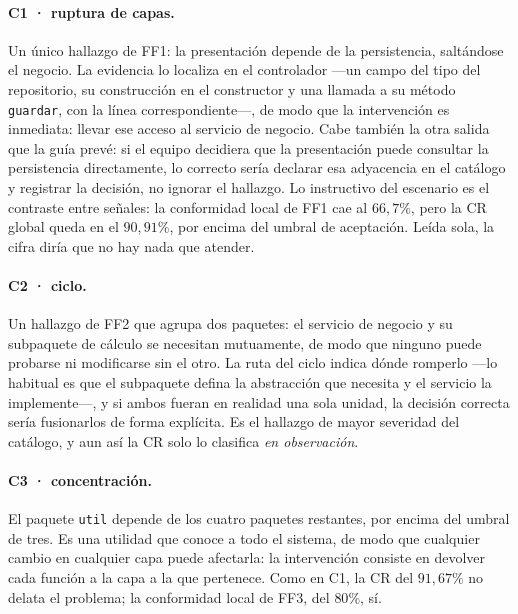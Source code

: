 \paragraph{C1 · ruptura de capas.} Un único hallazgo de FF1: la presentación depende de la persistencia, saltándose el negocio. La evidencia lo localiza en el controlador ---un campo del tipo del repositorio, su construcción en el constructor y una llamada a su método \texttt{guardar}, con la línea correspondiente---, de modo que la intervención es inmediata: llevar ese acceso al servicio de negocio. Cabe también la otra salida que la guía prevé: si el equipo decidiera que la presentación puede consultar la persistencia directamente, lo correcto sería declarar esa adyacencia en el catálogo y registrar la decisión, no ignorar el hallazgo. Lo instructivo del escenario es el contraste entre señales: la conformidad local de FF1 cae al $66{,}7\%$, pero la CR global queda en el $90{,}91\%$, por encima del umbral de aceptación. Leída sola, la cifra diría que no hay nada que atender.

\paragraph{C2 · ciclo.} Un hallazgo de FF2 que agrupa dos paquetes: el servicio de negocio y su subpaquete de cálculo se necesitan mutuamente, de modo que ninguno puede probarse ni modificarse sin el otro. La ruta del ciclo indica dónde romperlo ---lo habitual es que el subpaquete defina la abstracción que necesita y el servicio la implemente---, y si ambos fueran en realidad una sola unidad, la decisión correcta sería fusionarlos de forma explícita. Es el hallazgo de mayor severidad del catálogo, y aun así la CR solo lo clasifica \textit{en observación}.

\paragraph{C3 · concentración.} El paquete \texttt{util} depende de los cuatro paquetes restantes, por encima del umbral de tres. Es una utilidad que conoce a todo el sistema, de modo que cualquier cambio en cualquier capa puede afectarla: la intervención consiste en devolver cada función a la capa a la que pertenece. Como en C1, la CR del $91{,}67\%$ no delata el problema; la conformidad local de FF3, del $80\%$, sí.

